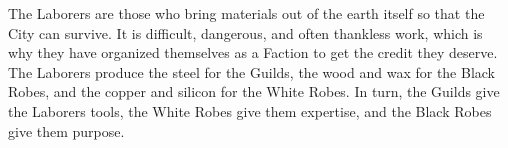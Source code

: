 The Laborers are those who bring materials out of the earth itself so that the City can survive. It is difficult, dangerous, and often thankless work, which is why they have organized themselves as a Faction to get the credit they deserve. The Laborers produce the steel for the Guilds, the wood and wax for the Black Robes, and the copper and silicon for the White Robes. In turn, the Guilds give the Laborers tools, the White Robes give them expertise, and the Black Robes give them purpose.